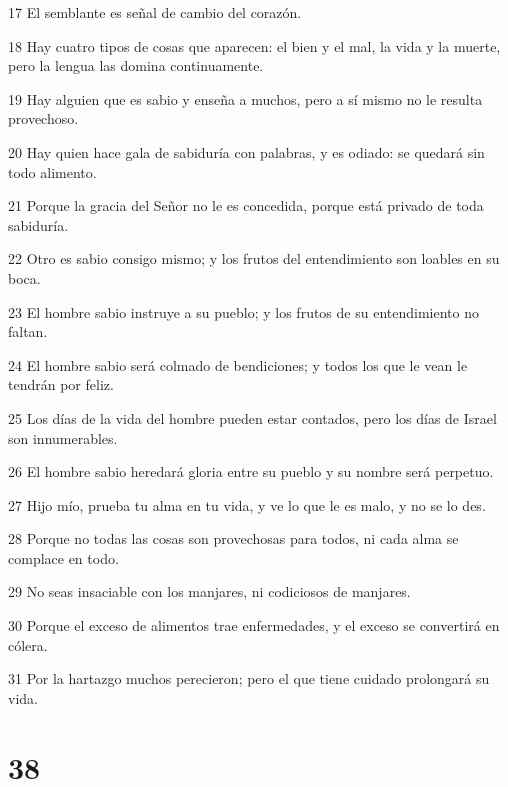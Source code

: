 \par 17 El semblante es señal de cambio del corazón.
\par 18 Hay cuatro tipos de cosas que aparecen: el bien y el mal, la vida y la muerte, pero la lengua las domina continuamente.
\par 19 Hay alguien que es sabio y enseña a muchos, pero a sí mismo no le resulta provechoso.
\par 20 Hay quien hace gala de sabiduría con palabras, y es odiado: se quedará sin todo alimento.
\par 21 Porque la gracia del Señor no le es concedida, porque está privado de toda sabiduría.
\par 22 Otro es sabio consigo mismo; y los frutos del entendimiento son loables en su boca.
\par 23 El hombre sabio instruye a su pueblo; y los frutos de su entendimiento no faltan.
\par 24 El hombre sabio será colmado de bendiciones; y todos los que le vean le tendrán por feliz.
\par 25 Los días de la vida del hombre pueden estar contados, pero los días de Israel son innumerables.
\par 26 El hombre sabio heredará gloria entre su pueblo y su nombre será perpetuo.
\par 27 Hijo mío, prueba tu alma en tu vida, y ve lo que le es malo, y no se lo des.
\par 28 Porque no todas las cosas son provechosas para todos, ni cada alma se complace en todo.
\par 29 No seas insaciable con los manjares, ni codiciosos de manjares.
\par 30 Porque el exceso de alimentos trae enfermedades, y el exceso se convertirá en cólera.
\par 31 Por la hartazgo muchos perecieron; pero el que tiene cuidado prolongará su vida.

\chapter{38}

